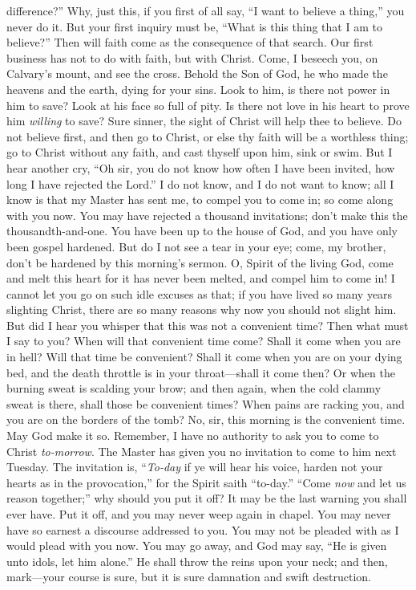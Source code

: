 \documentclass[
]{book}
\begin{document}
difference?'' Why, just this, if you first of all say, ``I want to believe a thing,'' you never do it. But your first inquiry must be, ``What is this thing that I am to believe?'' Then will faith come as the consequence of that search. Our first business has not to do with faith, but with Christ. Come, I beseech you, on Calvary's mount, and see the cross. Behold the Son of God, he who made the heavens and the earth, dying for your sins. Look to him, is there not power in him to save? Look at his face so full of pity. Is there not love in his heart to prove him \emph{willing} to save? Sure sinner, the sight of Christ will help thee to believe. Do not believe first, and then go to Christ, or else thy faith will be a worthless thing; go to Christ without any faith, and cast thyself upon him, sink or swim. But I hear another cry, ``Oh sir, you do not know how often I have been invited, how long I have rejected the Lord.'' I do not know, and I do not want to know; all I know is that my Master has sent me, to compel you to come in; so come along with you now. You may have rejected a thousand invitations; don't make this the thousandth-and-one. You have been up to the house of God, and you have only been gospel hardened. But do I not see a tear in your eye; come, my brother, don't be hardened by this morning's sermon. O, Spirit of the living God, come and melt this heart for it has never been melted, and compel him to come in! I cannot let you go on such idle excuses as that; if you have lived so many years slighting Christ, there are so many reasons why now you should not slight him. But did I hear you whisper that this was not a convenient time? Then what must I say to you? When will that convenient time come? Shall it come when you are in hell? Will that time be convenient? Shall it come when you are on your dying bed, and the death throttle is in your throat---shall it come then? Or when the burning sweat is scalding your brow; and then again, when the cold clammy sweat is there, shall those be convenient times? When pains are racking you, and you are on the borders of the tomb? No, sir, this morning is the convenient time. May God make it so. Remember, I have no authority to ask you to come to Christ \emph{to-morrow}. The Master has given you no invitation to come to him next Tuesday. The invitation is, ``\emph{To-day} if ye will hear his voice, harden not your hearts as in the provocation,'' for the Spirit saith ``to-day.'' ``Come \emph{now} and let us reason together;'' why should you put it off? It may be the last warning you shall ever have. Put it off, and you may never weep again in chapel. You may never have so earnest a discourse addressed to you. You may not be pleaded with as I would plead with you now. You may go away, and God may say, ``He is given unto idols, let him alone.'' He shall throw the reins upon your neck; and then, mark---your course is sure, but it is sure damnation and swift destruction.
\end{document}

